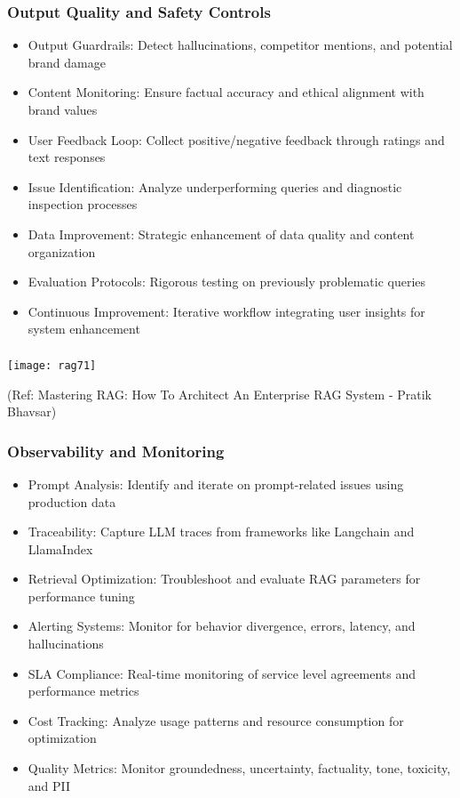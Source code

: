 \begin{frame}[fragile]\frametitle{Output Quality and Safety Controls}
      \begin{itemize}
        \item Output Guardrails: Detect hallucinations, competitor mentions, and potential brand damage
        \item Content Monitoring: Ensure factual accuracy and ethical alignment with brand values
        \item User Feedback Loop: Collect positive/negative feedback through ratings and text responses
        \item Issue Identification: Analyze underperforming queries and diagnostic inspection processes
        \item Data Improvement: Strategic enhancement of data quality and content organization
        \item Evaluation Protocols: Rigorous testing on previously problematic queries
        \item Continuous Improvement: Iterative workflow integrating user insights for system enhancement
      \end{itemize}
\end{frame}

\begin{frame}[fragile]\frametitle{}

	\begin{center}
	\texttt{[image: rag71]}
	
	{\tiny (Ref: Mastering RAG: How To Architect An Enterprise RAG System - Pratik Bhavsar)}
	
	\end{center}
	
	
\end{frame}


\begin{frame}[fragile]\frametitle{Observability and Monitoring}
      \begin{itemize}
        \item Prompt Analysis: Identify and iterate on prompt-related issues using production data
        \item Traceability: Capture LLM traces from frameworks like Langchain and LlamaIndex
        \item Retrieval Optimization: Troubleshoot and evaluate RAG parameters for performance tuning
        \item Alerting Systems: Monitor for behavior divergence, errors, latency, and hallucinations
        \item SLA Compliance: Real-time monitoring of service level agreements and performance metrics
        \item Cost Tracking: Analyze usage patterns and resource consumption for optimization
        \item Quality Metrics: Monitor groundedness, uncertainty, factuality, tone, toxicity, and PII
      \end{itemize}
\end{frame}

